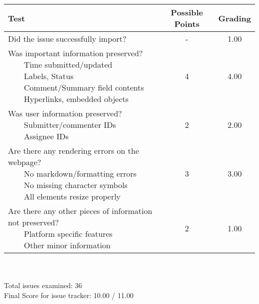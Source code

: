 \documentclass{article}
\newcommand{\tabitem}{~~\llap{\textbullet}~~}
\begin{document}
\begin{adjustbox}{center}
	\renewcommand{\arraystretch}{1.5}
	\begin{tabular}{ p{6cm} | c | c }
		Test & Possible Points & Grading \\ \hline
		Did the issue successfully import? & - & 1.00 \\
		\hline
		\makecell[l]{
			Was important information preserved? \\
			\tabitem Time submitted/updated \\
			\tabitem Labels, Status \\
			\tabitem Comment/Summary field contents \\
			\tabitem Hyperlinks, embedded objects}
		& 4 & 4.00 \\
		\hline
		\makecell[l]{
			Was user information preserved? \\
			\tabitem Submitter/commenter IDs \\
			\tabitem Assignee IDs
		} & 2 & 2.00 \\
		\hline
		\makecell[{{p{6cm}}}]{
			Are there any rendering errors on the webpage? \\
			\tabitem No markdown/formatting errors \\
			\tabitem No missing character symbols \\
			\tabitem All elements resize properly
		} & 3 & 3.00 \\
		\hline
		\makecell[{{p{6cm}}}]{
			Are there any other pieces of information not preserved? \\
			\tabitem Platform specific features \\
			\tabitem Other minor information
		} & 2 & 1.00 \\
	\end{tabular}
\end{adjustbox}
\\
\\Total issues examined: 36\\Final Score for issue tracker: 10.00 / 11.00 \\ \\\begin{adjustbox}{center}
\end{adjustbox}
\end{document}

